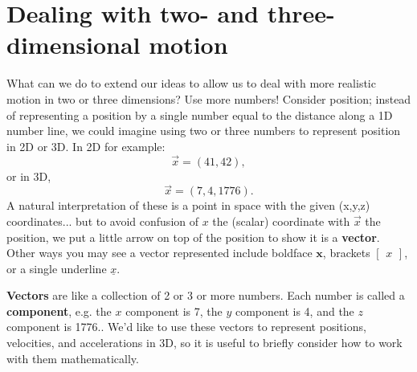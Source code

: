 \documentclass{tufte-handout}
\begin{document}
\section{Dealing with two- and three-dimensional motion}
What can we do to extend our ideas to allow us to deal with more realistic motion in two or three dimensions? Use more numbers!  Consider position; instead of representing a position by a single number equal to the distance along a 1D number line, we could imagine using two or three numbers to represent position in 2D or 3D. In 2D for example:
\begin{equation}
\vec{x} = (41, 42),
\end{equation}
or in 3D, 
\begin{equation}
\vec{x} = (7,4,1776).
\end{equation}
A natural interpretation of these is a point in space with the given (x,y,z) coordinates... but to avoid confusion of $x$ the (scalar) coordinate with $\vec{x}$ the position, we put a little arrow on top of the position to show it is a \textbf{vector}.  Other ways you may see a vector represented include boldface $\mathbf{x}$, brackets $\begin{bmatrix} x\end{bmatrix}$, or a single underline $\underline{x}$.

\textbf{Vectors} are like a collection of 2 or 3 or more numbers. Each number is called a \textbf{component}, e.g. the $x$ component is 7, the $y$ component is 4, and the $z$ component is 1776..  We'd like to use these vectors to represent positions, velocities, and accelerations in 3D, so it is useful to briefly consider how to work with them mathematically.
\end{document}
